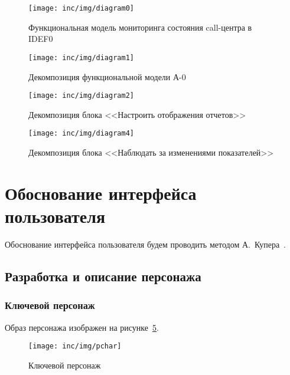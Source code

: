 \begin{figure}[!ht]
    \centering
    \texttt{[image: inc/img/diagram0]}
    \caption{Функциональная модель мониторинга состояния call-центра в IDEF0}
    \label{pic:idef0:a0}
\end{figure}

\begin{figure}[!ht]
    \centering
    \texttt{[image: inc/img/diagram1]}
    \caption{Декомпозиция функциональной модели А-0}
    \label{pic:idef0:a0:decompose}
\end{figure}

\begin{figure}[!ht]
    \centering
    \texttt{[image: inc/img/diagram2]}
    \caption{Декомпозиция блока <<Настроить отображения отчетов>>}
    \label{pic:idef0:a1:decompose}
\end{figure}

\begin{figure}[!ht]
    \centering
    \texttt{[image: inc/img/diagram4]}
    \caption{Декомпозиция блока <<Наблюдать за изменениями показателей>>}
    \label{pic:idef0:a2:decompose}
\end{figure}

\section{Обоснование интерфейса пользователя}

Обоснование интерфейса пользователя будем проводить методом А.~Купера~\cite{cooper2014face}.

\subsection{Разработка и описание персонажа}

\subsubsection{Ключевой персонаж}

Образ персонажа изображен на рисунке~\ref{pic:pcharacter}.

\begin{figure}[!ht]
    \centering
    \texttt{[image: inc/img/pchar]}
    \caption{Ключевой персонаж}
    \label{pic:pcharacter}
\end{figure}

